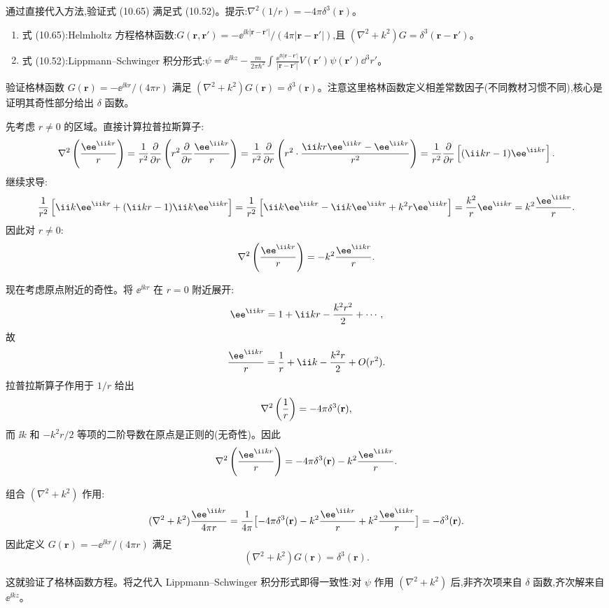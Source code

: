 \begin{question}
通过直接代入方法,验证式 (10.65) 满足式 (10.52)。提示:$\nabla^2(1/r)=-4\pi\delta^3(\mathbf r)$。

\par\smallskip
{}
\begin{enumerate}[leftmargin=2.2em,itemsep=0.12em,topsep=0.12em,parsep=0pt]
\item 式 (10.65):Helmholtz 方程格林函数:$G(\mathbf r,\mathbf r')=-\ee^{\ii k|\mathbf r-\mathbf r'|}/(4\pi|\mathbf r-\mathbf r'|)$,且 $(\nabla^2+k^2)G=\delta^3(\mathbf r-\mathbf r')$。
\item 式 (10.52):Lippmann--Schwinger 积分形式:$\psi=\ee^{\ii kz}-\frac{m}{2\pi\hbar^2}\int \frac{\ee^{\ii k|\mathbf r-\mathbf r'|}}{|\mathbf r-\mathbf r'|}V(\mathbf r')\psi(\mathbf r')\dd^3r'$。
\end{enumerate}

\begin{solution}
验证格林函数 $G(\mathbf r)=-\ee^{\ii kr}/(4\pi r)$ 满足 $(\nabla^2+k^2)G(\mathbf r)=\delta^3(\mathbf r)$。注意这里格林函数定义相差常数因子(不同教材习惯不同),核心是证明其奇性部分给出 $\delta$ 函数。

先考虑 $r\neq0$ 的区域。直接计算拉普拉斯算子:
\[
\nabla^2\left({\ee^{\ii kr}\over r}\right)
={1\over r^2}{\partial\over\partial r}\left(r^2{\partial\over\partial r}{\ee^{\ii kr}\over r}\right)
={1\over r^2}{\partial\over\partial r}\left(r^2\cdot{\ii kr \ee^{\ii kr}-\ee^{\ii kr}\over r^2}\right)
={1\over r^2}{\partial\over\partial r}\left[(\ii kr-1)\ee^{\ii kr}\right].
\]
继续求导:
\[
{1\over r^2}\left[\ii k \ee^{\ii kr}+(\ii kr-1)\ii k \ee^{\ii kr}\right]
={1\over r^2}\left[\ii k \ee^{\ii kr}-\ii k \ee^{\ii kr}+k^2r \ee^{\ii kr}\right]
={k^2\over r}\ee^{\ii kr}=k^2{\ee^{\ii kr}\over r}.
\]
因此对 $r\neq0$:
\[
\nabla^2\left({\ee^{\ii kr}\over r}\right)=-k^2{\ee^{\ii kr}\over r}.
\]

现在考虑原点附近的奇性。将 $\ee^{\ii kr}$ 在 $r=0$ 附近展开:
\[
\ee^{\ii kr}=1+\ii kr-{k^2r^2\over2}+\cdots,
\]
故
\[
{\ee^{\ii kr}\over r}={1\over r}+\ii k-{k^2r\over2}+O(r^2).
\]
拉普拉斯算子作用于 $1/r$ 给出
\[
\nabla^2\left({1\over r}\right)=-4\pi\delta^3(\mathbf r),
\]
而 $\ii k$ 和 $-k^2r/2$ 等项的二阶导数在原点是正则的(无奇性)。因此
\[
\nabla^2\left({\ee^{\ii kr}\over r}\right)=-4\pi\delta^3(\mathbf r)-k^2{\ee^{\ii kr}\over r}.
\]

组合 $(\nabla^2+k^2)$ 作用:
\[
(\nabla^2+k^2){\ee^{\ii kr}\over 4\pi r}
={1\over4\pi}\bigl[-4\pi\delta^3(\mathbf r)-k^2{\ee^{\ii kr}\over r}+k^2{\ee^{\ii kr}\over r}\bigr]
=-\delta^3(\mathbf r).
\]
因此定义 $G(\mathbf r)=-\ee^{\ii kr}/(4\pi r)$ 满足
\[
\boxed{(\nabla^2+k^2)G(\mathbf r)=\delta^3(\mathbf r).}
\]

这就验证了格林函数方程。将之代入 Lippmann--Schwinger 积分形式即得一致性:对 $\psi$ 作用 $(\nabla^2+k^2)$ 后,非齐次项来自 $\delta$ 函数,齐次解来自 $\ee^{\ii kz}$。
\end{solution}
\end{question}

